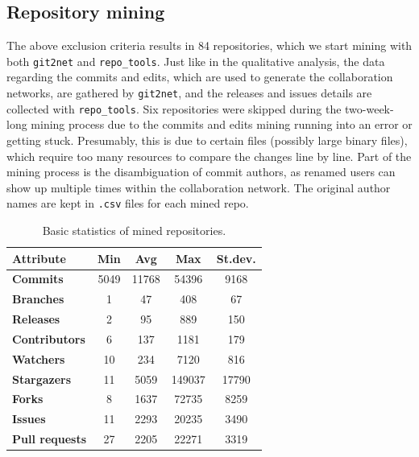 \subsection{Repository mining}

The above exclusion criteria results in 84 repositories, which we start mining with both \texttt{git2net} and \texttt{repo\_tools}. Just like in the qualitative analysis, the data regarding the commits and edits, which are used to generate the collaboration networks, are gathered by \texttt{git2net}, and the releases and issues details are collected with \texttt{repo\_tools}. Six repositories were skipped during the two-week-long mining process due to the commits and edits mining running into an error or getting stuck. Presumably, this is due to certain files (possibly large binary files), which require too many resources to compare the changes line by line. Part of the mining process is the disambiguation of commit authors, as renamed users can show up multiple times within the collaboration network. The original author names are kept in \texttt{.csv} files for each mined repo.

\begin{table}[!htbp]
    \centering
        \begin{tabular}{| l | c | c | c | c |}
            \hline
            \textbf{Attribute} & \textbf{Min} & \textbf{Avg} & \textbf{Max} & \textbf{St.dev.} \\
            \hline
            \textbf{Commits} & 5049 & 11768 & 54396 & 9168 \\
            \textbf{Branches} & 1 & 47 & 408 & 67 \\
            \textbf{Releases} & 2 & 95 & 889 & 150 \\
            \textbf{Contributors} & 6 & 137 & 1181 & 179 \\
            \textbf{Watchers} & 10 & 234 & 7120 & 816 \\
            \textbf{Stargazers} & 11 & 5059 & 149037 & 17790 \\
            \textbf{Forks} & 8 & 1637 & 72735 & 8259 \\
            \textbf{Issues} & 11 & 2293 & 20235 & 3490 \\
            \textbf{Pull requests} & 27 & 2205 & 22271 & 3319\\
            \hline
        \end{tabular}
    \caption{Basic statistics of mined repositories.}
    \label{tab:repo_stats}
\end{table}

